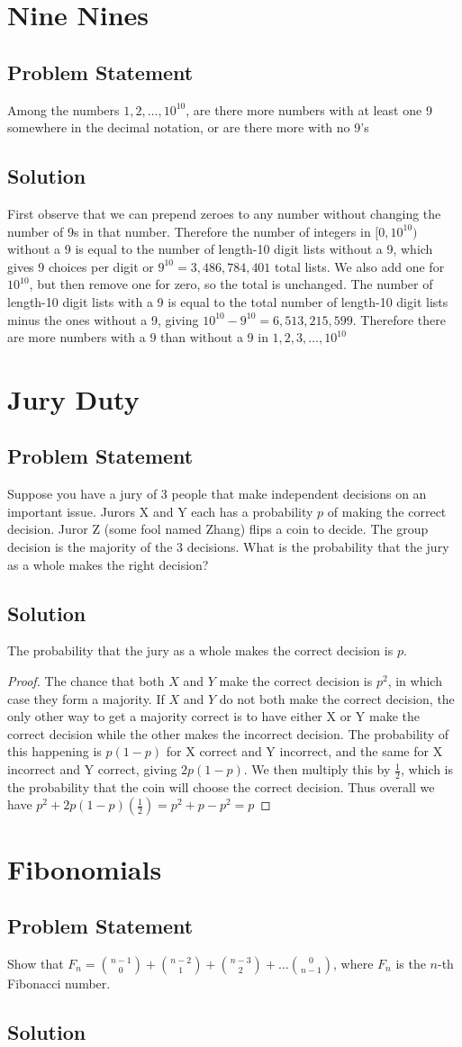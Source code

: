 \documentclass[12pt]{article}
\newcommand{\ProblemStatement}[1]{
\subsection*{Problem Statement}
#1
\subsection*{Solution}
}
\begin{document}
\section{Nine Nines}
\ProblemStatement{
Among the numbers $1, 2, \dots, 10^{10}$, are there more numbers with at least one 9 somewhere in the decimal notation, or are there more with no 9's
}

First observe that we can prepend zeroes to any number without changing the number of 9s in that number. Therefore the number of integers in $[0, 10^{10})$ without a 9 is equal to the number of length-10 digit lists without a 9, which gives 9 choices per digit or $9^{10}=3,486,784,401$ total lists. We also add one for $10^{10}$, but then remove one for zero, so the total is unchanged. The number of length-10 digit lists with a 9 is equal to the total number of length-10 digit lists minus the ones without a 9, giving $10^{10}-9^{10}=6,513,215,599$. Therefore there are more numbers with a 9 than without a 9 in $1, 2, 3, \dots, 10^{10}$

\section{Jury Duty}
\ProblemStatement{
Suppose you have a jury of 3 people that make independent decisions on an important issue. Jurors X and Y each has a probability $p$ of making the correct decision. Juror Z (some fool named Zhang)  flips a coin to decide. The group decision is the majority of the 3 decisions. What is the probability that the jury as a whole makes the right decision?
}
The probability that the jury as a whole makes the correct decision is $p$.
\begin{proof}
The chance that both $X$ and $Y$ make the correct decision is $p^2$, in which case they form a majority. If $X$ and $Y$ do not both make the correct decision, the only other way to get a majority correct is to have either X or Y make the correct decision while the other makes the incorrect decision. The probability of this happening is $p(1-p)$ for X correct and Y incorrect, and the same for X incorrect and Y correct, giving $2p(1-p)$. We then multiply this by $\frac{1}{2}$, which is the probability that the coin will choose the correct decision. Thus overall we have $p^2 + 2p(1-p)(\frac{1}{2}) = p^2 + p -p^2 = p$
\end{proof}

\section{Fibonomials}
\ProblemStatement{
Show that $F_n = \binom{n-1}{0} + \binom{n-2}{1} + \binom{n-3}{2} + \dots \binom{0}{n-1}$, where $F_n$ is the $n$-th Fibonacci number.
}
\end{document}
